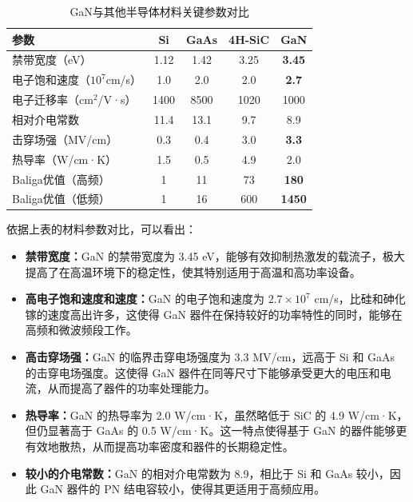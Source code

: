 \documentclass[12pt,a4paper]{article}
\begin{document}
\begin{table}[H]
    \centering
    \caption{GaN与其他半导体材料关键参数对比\cite{li2018gan}}
    \begin{tabular}{lcccc}
        \toprule
        \textbf{参数} & \textbf{Si} & \textbf{GaAs} & \textbf{4H-SiC} & \textbf{GaN} \\
        \midrule
        禁带宽度（eV） & 1.12 & 1.42 & 3.25 & \textbf{3.45} \\
        电子饱和速度（$10^7$cm/s） & 1.0 & 2.0 & 2.0 & \textbf{2.7} \\
        电子迁移率（cm$^2$/V·s） & 1400 & 8500 & 1020 & 1000 \\
        相对介电常数 & 11.4 & 13.1 & 9.7 & 8.9 \\
        击穿场强（MV/cm） & 0.3 & 0.4 & 3.0 & \textbf{3.3} \\
        热导率（W/cm·K） & 1.5 & 0.5 & 4.9 & 2.0 \\
        \midrule
        Baliga优值（高频） & 1 & 11 & 73 & \textbf{180} \\
        Baliga优值（低频） & 1 & 16 & 600 & \textbf{1450} \\
        \bottomrule
    \end{tabular}
\end{table}

依据上表的材料参数对比，可以看出：

\begin{itemize}
    \item \textbf{禁带宽度：}GaN 的禁带宽度为 3.45 eV，能够有效抑制热激发的载流子，极大提高了在高温环境下的稳定性，使其特别适用于高温和高功率设备。
    \item \textbf{高电子饱和速度和速度：}GaN 的电子饱和速度为 $2.7 \times 10^7$ cm/s，比硅和砷化镓的速度高出许多，这使得 GaN 器件在保持较好的功率特性的同时，能够在高频和微波频段工作。
    \item \textbf{高击穿场强：}GaN 的临界击穿电场强度为 3.3 MV/cm，远高于 Si 和 GaAs 的击穿电场强度。这使得 GaN 器件在同等尺寸下能够承受更大的电压和电流，从而提高了器件的功率处理能力。
    \item \textbf{热导率：}GaN 的热导率为 2.0 W/cm·K，虽然略低于 SiC 的 4.9 W/cm·K，但仍显著高于 GaAs 的 0.5 W/cm·K。这一特点使得基于 GaN 的器件能够更有效地散热，从而提高功率密度和器件的长期稳定性。
    \item \textbf{较小的介电常数：}GaN 的相对介电常数为 8.9，相比于 Si 和 GaAs 较小，因此 GaN 器件的 PN 结电容较小，使得其更适用于高频应用。
\end{itemize}
\end{document}
